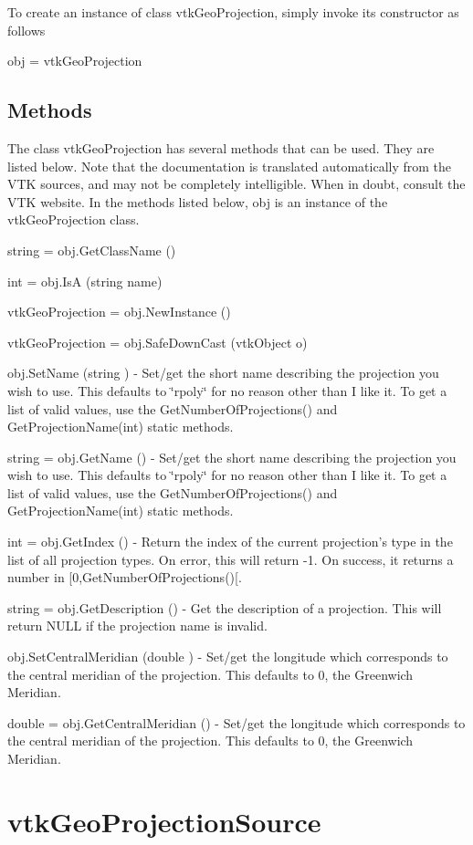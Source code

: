 To create an instance of class vtk\-Geo\-Projection, simply invoke its constructor as follows \begin{DoxyVerb}  obj = vtkGeoProjection
\end{DoxyVerb}
 \hypertarget{vtkwidgets_vtkxyplotwidget_Methods}{}\subsection{Methods}\label{vtkwidgets_vtkxyplotwidget_Methods}
The class vtk\-Geo\-Projection has several methods that can be used. They are listed below. Note that the documentation is translated automatically from the V\-T\-K sources, and may not be completely intelligible. When in doubt, consult the V\-T\-K website. In the methods listed below, {\ttfamily obj} is an instance of the vtk\-Geo\-Projection class. 
\begin{DoxyItemize}
\item {\ttfamily string = obj.\-Get\-Class\-Name ()}  
\item {\ttfamily int = obj.\-Is\-A (string name)}  
\item {\ttfamily vtk\-Geo\-Projection = obj.\-New\-Instance ()}  
\item {\ttfamily vtk\-Geo\-Projection = obj.\-Safe\-Down\-Cast (vtk\-Object o)}  
\item {\ttfamily obj.\-Set\-Name (string )} -\/ Set/get the short name describing the projection you wish to use. This defaults to \char`\"{}rpoly\char`\"{} for no reason other than I like it. To get a list of valid values, use the Get\-Number\-Of\-Projections() and Get\-Projection\-Name(int) static methods.  
\item {\ttfamily string = obj.\-Get\-Name ()} -\/ Set/get the short name describing the projection you wish to use. This defaults to \char`\"{}rpoly\char`\"{} for no reason other than I like it. To get a list of valid values, use the Get\-Number\-Of\-Projections() and Get\-Projection\-Name(int) static methods.  
\item {\ttfamily int = obj.\-Get\-Index ()} -\/ Return the index of the current projection's type in the list of all projection types. On error, this will return -\/1. On success, it returns a number in \mbox{[}0,Get\-Number\-Of\-Projections()\mbox{[}.  
\item {\ttfamily string = obj.\-Get\-Description ()} -\/ Get the description of a projection. This will return N\-U\-L\-L if the projection name is invalid.  
\item {\ttfamily obj.\-Set\-Central\-Meridian (double )} -\/ Set/get the longitude which corresponds to the central meridian of the projection. This defaults to 0, the Greenwich Meridian.  
\item {\ttfamily double = obj.\-Get\-Central\-Meridian ()} -\/ Set/get the longitude which corresponds to the central meridian of the projection. This defaults to 0, the Greenwich Meridian.  
\end{DoxyItemize}\hypertarget{vtkgeovis_vtkgeoprojectionsource}{}\section{vtk\-Geo\-Projection\-Source}\label{vtkgeovis_vtkgeoprojectionsource}
